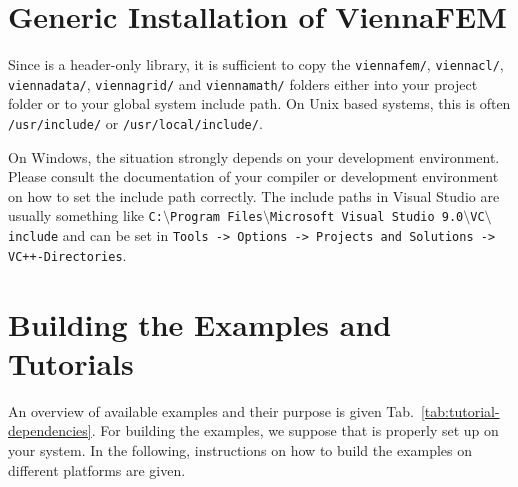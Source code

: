 \section{Generic Installation of ViennaFEM} \label{sec:viennafem-installation}
Since {\ViennaFEM} is a header-only library, it is sufficient to copy the
\lstinline|viennafem/|, \lstinline|viennacl/|, \lstinline|viennadata/|, \lstinline|viennagrid/| and \lstinline|viennamath/| 
folders either into your project folder or to your global system
include path. On Unix based systems, this is often \lstinline|/usr/include/| or
\lstinline|/usr/local/include/|.

On Windows, the situation strongly depends on your development environment.
Please consult the documentation of your compiler or development environment on how to set the include
path correctly. The include paths in Visual Studio are usually something like
\texttt{C:$\setminus$Program Files$\setminus$Microsoft Visual Studio
9.0$\setminus$VC$\setminus$include}
and can be set in \texttt{Tools -> Options -> Projects and Solutions ->
VC++-\-Directories}. 


\section{Building the Examples and Tutorials}
An overview of available examples and their purpose is given
Tab.~\ref{tab:tutorial-dependencies}.
For building the examples, we suppose that {\CMake} is properly set up
on your system. In the following, instructions on how to build the examples on different platforms are given.

